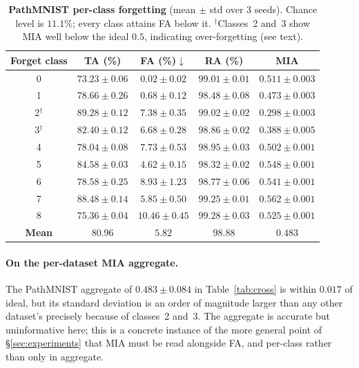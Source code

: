 \documentclass{article}
\theoremstyle{remark}
\theoremstyle{plain}
\begin{document}
\begin{table}[t]
\centering
\caption{\textbf{PathMNIST per-class forgetting} (mean $\pm$ std over 3 seeds).
Chance level is $11.1\%$; every class attains FA below it. $^{\dagger}$Classes~2
and~3 show MIA well below the ideal $0.5$, indicating over-forgetting (see
text).}
\label{tab:app_pathmnist}
\begin{tabular}{@{}ccccc@{}}
\toprule
Forget class & TA (\%) & FA (\%)$\downarrow$ & RA (\%) & MIA \\
\midrule
0 & $73.23 \pm 0.06$ & $0.02 \pm 0.02$ & $99.01 \pm 0.01$ & $0.511 \pm 0.003$ \\
1 & $78.66 \pm 0.26$ & $0.68 \pm 0.12$ & $98.48 \pm 0.08$ & $0.473 \pm 0.003$ \\
2$^{\dagger}$ & $89.28 \pm 0.12$ & $7.38 \pm 0.35$ & $99.02 \pm 0.02$ & $0.298 \pm 0.003$ \\
3$^{\dagger}$ & $82.40 \pm 0.12$ & $6.68 \pm 0.28$ & $98.86 \pm 0.02$ & $0.388 \pm 0.005$ \\
4 & $78.04 \pm 0.08$ & $7.73 \pm 0.53$ & $98.95 \pm 0.03$ & $0.502 \pm 0.001$ \\
5 & $84.58 \pm 0.03$ & $4.62 \pm 0.15$ & $98.32 \pm 0.02$ & $0.548 \pm 0.001$ \\
6 & $78.58 \pm 0.25$ & $8.93 \pm 1.23$ & $98.77 \pm 0.06$ & $0.541 \pm 0.001$ \\
7 & $88.48 \pm 0.14$ & $5.85 \pm 0.50$ & $99.25 \pm 0.01$ & $0.562 \pm 0.001$ \\
8 & $75.36 \pm 0.04$ & $10.46 \pm 0.45$ & $99.28 \pm 0.03$ & $0.525 \pm 0.001$ \\
\midrule
\textbf{Mean} & $\mathbf{80.96}$ & $\mathbf{5.82}$ & $\mathbf{98.88}$ & $\mathbf{0.483}$ \\
\bottomrule
\end{tabular}
\end{table}

\paragraph{On the per-dataset MIA aggregate.}
The PathMNIST aggregate of $0.483 \pm 0.084$ in Table~\ref{tab:cross} is within
$0.017$ of ideal, but its standard deviation is an order of magnitude larger
than any other dataset's precisely because of classes~2 and~3. The aggregate is
accurate but uninformative here; this is a concrete instance of the more general
point of \S\ref{sec:experiments} that MIA must be read alongside FA, and
per-class rather than only in aggregate.
\end{document}
